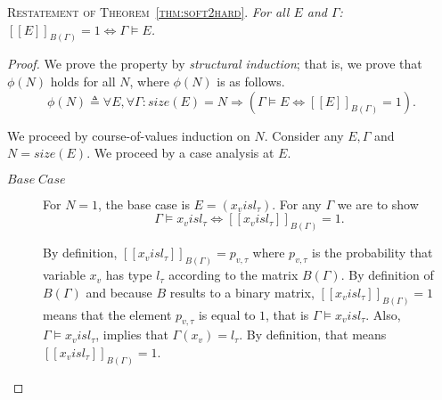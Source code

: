 \documentclass[acmsmall, review, anonymous]{acmart}\settopmatter{printfolios=true,printccs=false,printacmref=false}
\newcommand{\qqpi}[2]{[\![#2]\!]_{#1}}
\newcommand{\restate}[1]{\textsc{Restatement of #1}. \hspace*{1pt} \it}
\begin{document}
\restate{Theorem~\ref{thm:soft2hard}} For all $E$ and $\Gamma$: $\qqpi{B(\Gamma)}{E} = 1 \Leftrightarrow \Gamma \models E$.
\begin{proof}
  We prove the property by \emph{structural induction}; that is,
  we prove that $\phi(N)$ holds for all $N$, where $\phi(N)$ is as follows.
        \begin{equation*}
            \phi(N) \triangleq
                \forall E, \forall \Gamma :
                size(E)=N \Rightarrow (\Gamma \models E \Leftrightarrow \qqpi{B(\Gamma)}{E} = 1).
        \end{equation*}
        
  We proceed by course-of-values induction on $N$.
  Consider any $E, \Gamma$ and $N = size(E)$. We proceed by a case analysis at $E$.
  \begin{description}
      \item[$Base\;Case$]
                  For $N=1$, the base case is $E = (x_v \mathrel{is} l_\tau)$.
                  For any $\Gamma$ we are to show
                  \begin{equation*}
                  \Gamma \models x_v \mathrel{is} l_\tau \Leftrightarrow{}\qqpi{B(\Gamma)}{x_v \mathrel{is} l_\tau} = 1.
                  \end{equation*}
                  
                  By definition, $\qqpi{B(\Gamma)}{x_v \mathrel{is} l_\tau} = p_{v,\tau}$
                  where $p_{v,\tau}$ is the probability that variable $x_v$ has type $l_\tau$ according to the matrix $B(\Gamma)$. 
                  By definition of $B(\Gamma)$ and because $B$ results to  a binary matrix,  
                  $\qqpi{B(\Gamma)}{x_v \mathrel{is} l_\tau} = 1$
                  means that the element $p_{v,\tau}$ is equal to $1$, that is 
                  $\Gamma \models x_v \mathrel{is} l_\tau$.
                  Also, $\Gamma \models x_v \mathrel{is} l_\tau$, implies that $\Gamma(x_v)=l_\tau$. By definition, that
                  means  $\qqpi{B(\Gamma)}{x_v \mathrel{is} l_\tau} = 1$.
      

\end{description}
\end{proof}
\end{document}
